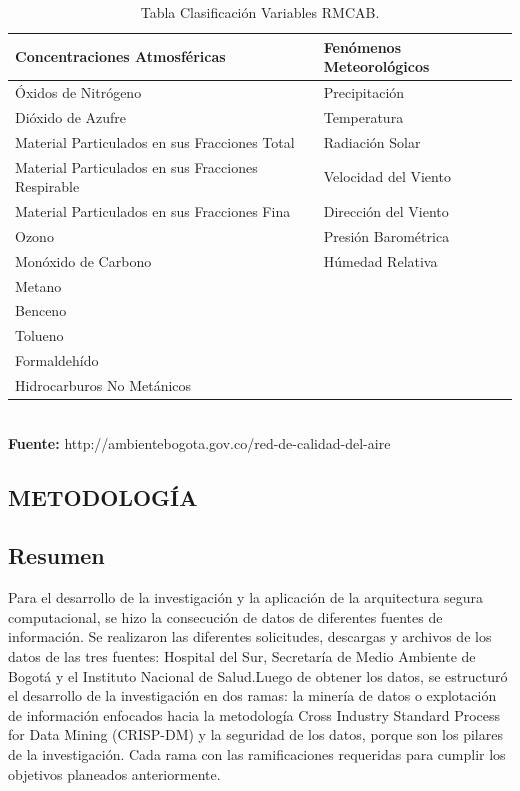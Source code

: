 \documentclass[a4paper,openright,12pt]{book}
\theoremstyle{definition}
\theoremstyle{remark}
\begin{document}
\begin{table}[!ht]
\begin{center}
\caption{Tabla Clasificación Variables RMCAB.}
\resizebox{10cm}{!} {
\begin{tabular}{|l|l|}
\hline
Concentraciones Atmosféricas & Fenómenos  Meteorológicos \\
\hline \hline
Óxidos de Nitrógeno & Precipitación \\ \hline
Dióxido de Azufre & Temperatura \\ \hline
Material Particulados en sus Fracciones Total & Radiación Solar \\ \hline
Material Particulados en sus Fracciones Respirable & Velocidad del Viento \\ \hline
Material Particulados en sus Fracciones Fina & Dirección del Viento \\ \hline
Ozono & Presión Barométrica \\ \hline
Monóxido de Carbono & Húmedad Relativa \\ \hline
Metano &  \\ \hline
Benceno &  \\ \hline
Tolueno &  \\ \hline
Formaldehído &  \\ \hline
Hidrocarburos No Metánicos & \\ \hline
\end{tabular}
}
\label{tabla:variables RMCAB}
\\\textbf{Fuente:} http://ambientebogota.gov.co/red-de-calidad-del-aire
\end{center}
\end{table}


\begin{center}
\chapter{METODOLOGÍA}\label{cap.metodologia}
\end{center}
\section{Resumen}
Para el desarrollo de la investigación y la aplicación de la arquitectura segura computacional, se hizo la consecución de datos de diferentes fuentes de información. Se realizaron las diferentes solicitudes, descargas y archivos de los datos de las tres fuentes: Hospital del Sur, Secretaría de Medio Ambiente de Bogotá y el Instituto Nacional de Salud.Luego de obtener los datos, se estructuró el desarrollo de la investigación en dos ramas: la minería de datos o explotación de información enfocados hacia la metodología Cross Industry Standard Process for Data Mining (CRISP-DM)  y la seguridad de los datos, porque son los pilares de la investigación. Cada rama con las ramificaciones requeridas para cumplir los objetivos planeados anteriormente.
\end{document}
